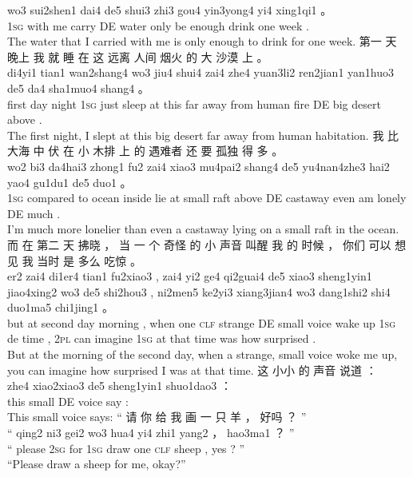 \documentclass[UTF8]{ctexart}
\begin{document}
\begin{exe}
wo3 sui2shen1 dai4 de5 shui3 zhi3 gou4 yin3yong4 yi4 xing1qi1 。
\\
\textsc{1sg} {with me} carry DE water only {be enough} drink one week .
\\
\trans The water that I carried with me is only enough to drink for one week. 
\ex
\glll
第一 天 晚上 我 就 睡 在 这 远离 人间 烟火 的 大 沙漠 上 。
\\
di4yi1 tian1 wan2shang4 wo3 jiu4 shui4 zai4 zhe4 yuan3li2 ren2jian1 yan1huo3 de5 da4 sha1muo4 shang4 。
\\
first day night \textsc{1sg} just sleep at this {far away from} human fire DE big desert above .
\\
\trans The first night, I slept at this big desert far away from human habitation.
\ex
\glll
我 比 大海 中 伏 在 小 木排 上 的 遇难者 还 要 孤独 得 多 。
\\
wo2 bi3 da4hai3 zhong1 fu2 zai4 xiao3 mu4pai2 shang4 de5 yu4nan4zhe3 hai2 yao4 gu1du1 de5 duo1 。
\\
\textsc{1sg} {compared to} ocean inside lie at small raft above DE castaway even am lonely DE much .
\\
\trans I'm much more lonelier than even a castaway lying on a small raft in the ocean. 
\ex
\glll
而 在 第二 天 拂晓 ， 当 一 个 奇怪 的 小 声音 叫醒 我 的 时候 ， 你们 可以 想见 我 当时 是 多么 吃惊 。
\\
er2 zai4 di1er4 tian1 fu2xiao3 , zai4 yi2 ge4 qi2guai4 de5 xiao3 sheng1yin1 jiao4xing2 wo3 de5 shi2hou3 , ni2men5 ke2yi3 xiang3jian4 wo3 dang1shi2 shi4 duo1ma5 chi1jing1 。
\\
but at second day morning , when one \textsc{clf} strange DE small voice {wake up} \textsc{1sg} de time , {\textsc{2pl}} can imagine \textsc{1sg} {at that time} was how surprised . 
\\
\trans But at the morning of the second day, when a strange, small voice woke me up, you can imagine how surprised I was at that time. 
\ex
\glll
这 小小 的 声音 说道 ：
\\
zhe4 xiao2xiao3 de5 sheng1yin1 shuo1dao3 ：
\\
this small DE voice say :
\\
\trans This small voice says:
\ex
\glll
“ 请 你 给 我 画 一 只 羊 ， 好吗 ？ ”
\\
“ qing2 ni3 gei2 wo3 hua4 yi4 zhi1 yang2 ， hao3ma1 ？ ”
\\
`` please \textsc{2sg} for \textsc{1sg} draw one \textsc{clf} sheep , yes ? ''
\\
\trans ``Please draw a sheep for me, okay?''

\end{exe}
\end{document}
